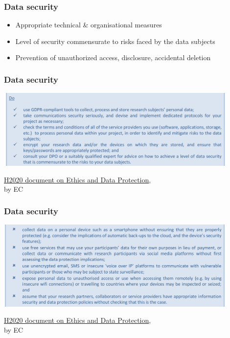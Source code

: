 \documentclass[17pt,aspectratio=169,hyperref={pdfusetitle,colorlinks,allcolors=olive}]{beamer}
\begin{document}
\begin{frame}[fragile]
  \frametitle{Data security}

 
  \begin{itemize}
  \item Appropriate  technical \& organisational measures
  \item Level of security commensurate to risks faced by the  data  subjects
  \item Prevention of unauthorized access, disclosure, accidental deletion
  \end{itemize}
\end{frame}

\begin{frame}[fragile]
  \frametitle{Data security}

  \begin{center}
  \includegraphics[width=12cm]{figs/gdpr-data-security}
  \end{center}  
  
  {\footnotesize
    \begin{flushright}
    \href{https://ec.europa.eu/research/participants/data/ref/h2020/grants_manual/hi/ethics/h2020_hi_ethics-data-protection_en.pdf}{H2020 document on Ethics and Data Protection}, \\ by EC
  \end{flushright}
  }
 
\end{frame}

\begin{frame}[fragile]
  \frametitle{Data security}

  \begin{center}
  \includegraphics[width=12cm]{figs/gdpr-data-security-b}
  \end{center}  
  
  {\footnotesize
    \begin{flushright}
    \href{https://ec.europa.eu/research/participants/data/ref/h2020/grants_manual/hi/ethics/h2020_hi_ethics-data-protection_en.pdf}{H2020 document on Ethics and Data Protection}, \\ by EC
  \end{flushright}
  }
 
\end{frame}
\end{document}
